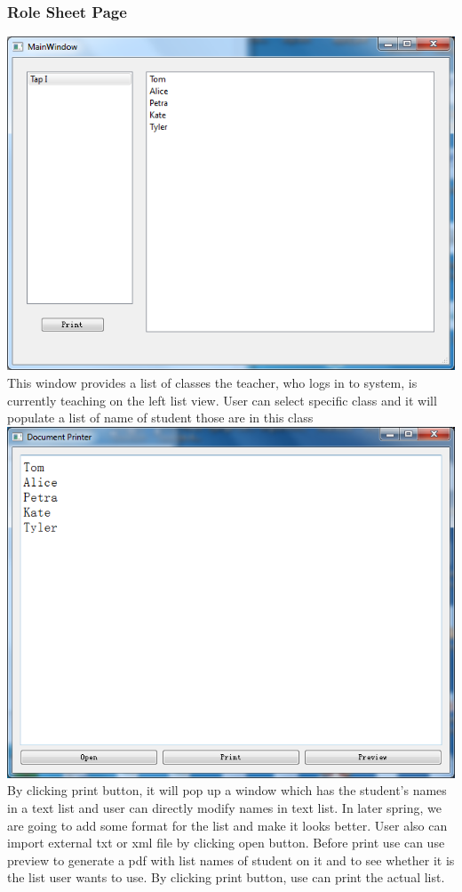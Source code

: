 \subsubsection{Role Sheet Page}
\includegraphics[scale=0.5]{pics/role.png}\\
This window provides a list of classes the teacher, who logs in to system, is currently teaching on the left list view. User can select specific class and it will populate a list of name of student those are in this class\\
\includegraphics[scale=0.5]{pics/print.png}\\
By clicking print button, it will pop up a window which has the student's names in a text list and user can directly modify names in text list. In later spring, we are going to add some format for the list and make it looks better. User also can import external txt or xml file by clicking open button. Before print use can use preview to generate a pdf with list names of student on it and to see whether it is the list user wants to use. By clicking print button, use can print the actual list.

